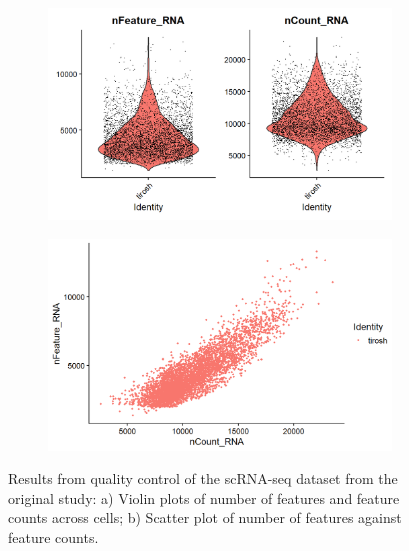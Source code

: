 \documentclass[11pt]{article}
\begin{document}
\begin{figure}
    \begin{subfigure}{.5\textwidth}
      \centering
      \includegraphics[width=.9\linewidth]{plots/plot_md-vln.png}
      \caption{}
      \label{fig:vln}
    \end{subfigure}
    \begin{subfigure}{.5\textwidth}
      \centering
      \includegraphics[width=.9\linewidth]{plots/plot_md-scat.png}
      \caption{}
      \label{fig:scat}
    \end{subfigure}
    \caption{Results from quality control of the scRNA-seq dataset from the original study: a) Violin plots of number of features and feature counts across cells; b) Scatter plot of number of features against feature counts.}
    \label{fig:pre-process}
\end{figure}
\end{document}
